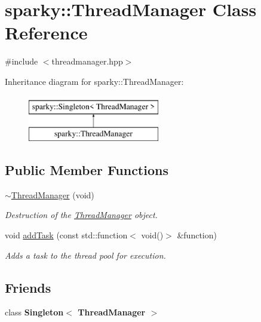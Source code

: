 \hypertarget{classsparky_1_1_thread_manager}{}\section{sparky\+:\+:Thread\+Manager Class Reference}
\label{classsparky_1_1_thread_manager}


{\ttfamily \#include $<$threadmanager.\+hpp$>$}

Inheritance diagram for sparky\+:\+:Thread\+Manager\+:\begin{figure}[H]
\begin{center}
\leavevmode
\includegraphics[height=2.000000cm]{classsparky_1_1_thread_manager}
\end{center}
\end{figure}
\subsection*{Public Member Functions}
\begin{DoxyCompactItemize}
\item 
\hyperlink{classsparky_1_1_thread_manager_a5442dd3baea9513c406b02e8a6b97b73}{$\sim$\+Thread\+Manager} (void)
\begin{DoxyCompactList}\small\item\em Destruction of the \hyperlink{classsparky_1_1_thread_manager}{Thread\+Manager} object. \end{DoxyCompactList}\item 
void \hyperlink{classsparky_1_1_thread_manager_ade9dc04071ece6e4aec12b5479dfbd53}{add\+Task} (const std\+::function$<$ void()$>$ \&function)
\begin{DoxyCompactList}\small\item\em Adds a task to the thread pool for execution. \end{DoxyCompactList}\end{DoxyCompactItemize}
\subsection*{Friends}
\begin{DoxyCompactItemize}
\item 
class {\bfseries Singleton$<$ Thread\+Manager $>$}\hypertarget{classsparky_1_1_thread_manager_a3c218ec0248bcc9ff4b63b9d988126d3}{}\label{classsparky_1_1_thread_manager_a3c218ec0248bcc9ff4b63b9d988126d3}

\end{DoxyCompactItemize}
